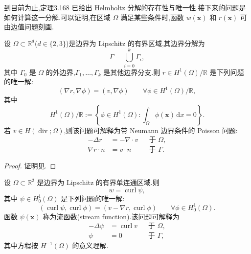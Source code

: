 \begin{note}\label{note:computing-helmholtz-decomposition}
到目前为止,定理\hyperref[thm:helmholtz-decomposition]{3.168} 已给出 Helmholtz 分解的存在性与唯一性.接下来的问题是如何计算这一分解.可以证明,在区域 $\Omega$ 满足某些条件时,函数 $w(\bm{x})$ 和 $r(\bm{x})$ 可由边值问题刻画.
\end{note}

\begin{lemma}[$r$ 的确定]\label{lem:helmholtz-scalar-potential}
设 $\Omega\subset\mathbb{R}^d$($d\in\{2,3\}$)是边界为 Lipschitz 的有界区域,其边界分解为
\[
  \Gamma=\bigcup_{i=0}^k\Gamma_i,
\]
其中 $\Gamma_0$ 是 $\Omega$ 的外边界,$\Gamma_1,\ldots,\Gamma_k$ 是其他边界分支.则 $r\in H^1(\Omega)/\mathbb{R}$ 是下列问题的唯一解:
\[
  (\nabla r,\nabla\phi)=(v,\nabla\phi)
  \qquad\forall\phi\in H^1(\Omega)/\mathbb{R},
\]
其中
\[
  H^1(\Omega)/\mathbb{R}
    :=\left\{\phi\in H^1(\Omega):
       \int_\Omega\phi(\bm{x})\,\mathrm{d}x=0\right\}.
\]
若 $v\in H(\operatorname{div};\Omega)$,则该问题可解释为带 Neumann 边界条件的 Poisson 问题:
\begin{equation}\label{eq:helmholtz-neumann-poisson}
\begin{aligned}
  -\Delta r&=-\nabla\cdot v &&\text{于 }\Omega,\\
  \nabla r\cdot n&=v\cdot n &&\text{于 }\Gamma.
\end{aligned}
\end{equation}
\end{lemma}

\begin{proof}
证明见\textcite[第 41 页]{GiraultRaviart1986}.
\end{proof}

\begin{lemma}\label{lem:helmholtz-vector-potential-2d}
设 $\Omega\subset\mathbb{R}^2$ 是边界为 Lipschitz 的有界单连通区域.则
\[
  w=\operatorname{curl}\psi,
\]
其中 $\psi\in H_0^1(\Omega)$ 是下列问题的唯一解:
\begin{equation}\label{eq:helmholtz-stream-function-weak}
  (\operatorname{curl}\psi,\operatorname{curl}\phi)
    =(v-\nabla r,\operatorname{curl}\phi)
    \qquad\forall\phi\in H_0^1(\Omega).
\end{equation}
函数 $\psi(\bm{x})$ 称为流函数(stream function).该问题可解释为
\begin{equation}\label{eq:helmholtz-stream-function-poisson}
\begin{aligned}
  -\Delta\psi&=\operatorname{curl}v &&\text{于 }\Omega,\\
  \psi&=0 &&\text{于 }\Gamma,
\end{aligned}
\end{equation}
其中方程按 $H^{-1}(\Omega)$ 的意义理解.
\end{lemma}

